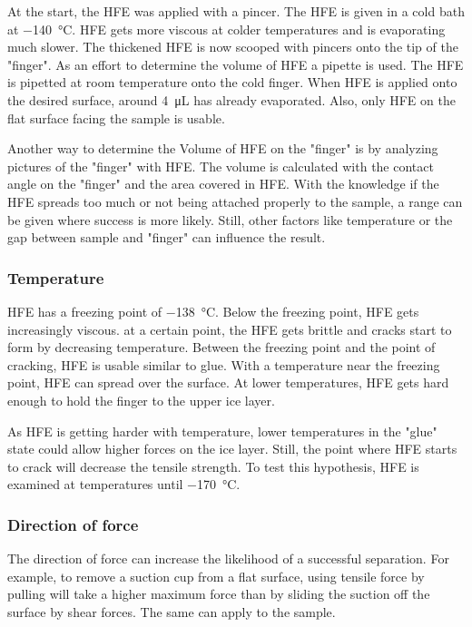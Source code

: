 At the start, the HFE was applied with a pincer. The HFE is given in a cold bath at \SI{-140}{\degreeCelsius}. HFE gets more viscous at colder temperatures and is evaporating much slower. The thickened HFE is now scooped with pincers onto the tip of the "finger". As an effort to determine the volume of HFE a pipette is used. The HFE is pipetted at room temperature onto the cold finger. When HFE is applied onto the desired surface, around \SI{4}{\micro\liter} has already evaporated. Also, only HFE on the flat surface facing the sample is usable.

Another way to determine the Volume of HFE on the "finger" is by analyzing pictures of the "finger" with HFE. The volume is calculated with the contact angle on the "finger" and the area covered in HFE. With the knowledge if the HFE spreads too much or not being attached properly to the sample, a range can be given where success is more likely. Still, other factors like temperature or the gap between sample and "finger" can influence the result.

\subsubsection{Temperature}

HFE has a freezing point of \SI{-138}{\degreeCelsius}. Below the freezing point, HFE gets increasingly viscous. at a certain point, the HFE gets brittle and cracks start to form by decreasing temperature. Between the freezing point and the point of cracking, HFE is usable similar to glue. With a temperature near the freezing point, HFE can spread over the surface. At lower temperatures, HFE gets hard enough to hold the finger to the upper ice layer.

As HFE is getting harder with temperature, lower temperatures in the "glue" state could allow higher forces on the ice layer. Still, the point where HFE starts to crack will decrease the tensile strength. To test this hypothesis, HFE is examined at temperatures until \SI{-170}{\degreeCelsius}.

\subsubsection{Direction of force}

The direction of force can increase the likelihood of a successful separation. For example, to remove a suction cup from a flat surface, using tensile force by pulling will take a higher maximum force than by sliding the suction off the surface by shear forces. The same can apply to the sample. 

